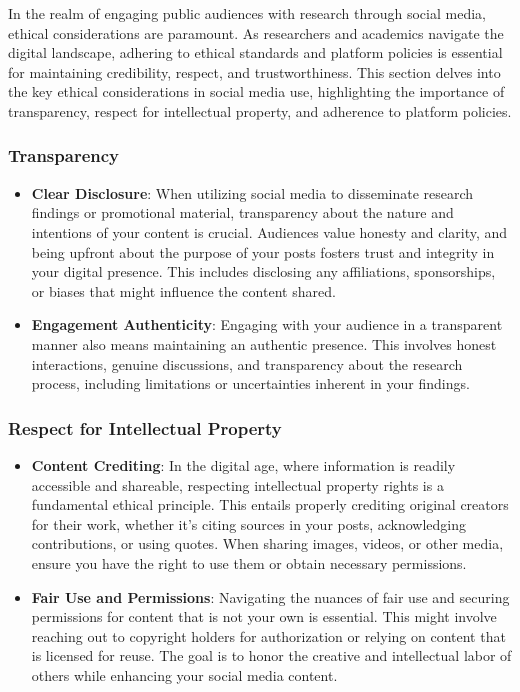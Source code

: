 \documentclass[
]{book}
\begin{document}
In the realm of engaging public audiences with research through social media, ethical considerations are paramount. As researchers and academics navigate the digital landscape, adhering to ethical standards and platform policies is essential for maintaining credibility, respect, and trustworthiness. This section delves into the key ethical considerations in social media use, highlighting the importance of transparency, respect for intellectual property, and adherence to platform policies.

\hypertarget{transparency}{%
\subsubsection{Transparency}\label{transparency}}

\begin{itemize}
\item
  \textbf{Clear Disclosure}: When utilizing social media to disseminate research findings or promotional material, transparency about the nature and intentions of your content is crucial. Audiences value honesty and clarity, and being upfront about the purpose of your posts fosters trust and integrity in your digital presence. This includes disclosing any affiliations, sponsorships, or biases that might influence the content shared.
\item
  \textbf{Engagement Authenticity}: Engaging with your audience in a transparent manner also means maintaining an authentic presence. This involves honest interactions, genuine discussions, and transparency about the research process, including limitations or uncertainties inherent in your findings.
\end{itemize}

\hypertarget{respect-for-intellectual-property}{%
\subsubsection{Respect for Intellectual Property}\label{respect-for-intellectual-property}}

\begin{itemize}
\item
  \textbf{Content Crediting}: In the digital age, where information is readily accessible and shareable, respecting intellectual property rights is a fundamental ethical principle. This entails properly crediting original creators for their work, whether it's citing sources in your posts, acknowledging contributions, or using quotes. When sharing images, videos, or other media, ensure you have the right to use them or obtain necessary permissions.
\item
  \textbf{Fair Use and Permissions}: Navigating the nuances of fair use and securing permissions for content that is not your own is essential. This might involve reaching out to copyright holders for authorization or relying on content that is licensed for reuse. The goal is to honor the creative and intellectual labor of others while enhancing your social media content.
\end{itemize}
\end{document}
